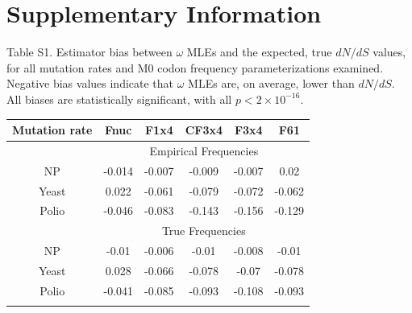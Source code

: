 \documentclass{pnastwo}
\begin{document}
	
\section{Supplementary Information}

\vspace{2cm}

\noindent Table S1. Estimator bias between $\omega$ MLEs and the expected, true $dN/dS$ values, for all mutation rates and M0 codon frequency parameterizations examined. Negative bias values indicate that $\omega$ MLEs are, on average, lower than $dN/dS$. All biases are statistically significant, with all $p < 2\times10^{-16}$.
\begin{table}[htbp]
	\begin{tabular}{c c c c c c}
		\hline\noalign{\smallskip}
		Mutation rate & Fnuc & F1x4 & CF3x4 & F3x4 & F61 \\
		\hline\noalign{\smallskip}
		& \multicolumn{5}{c}{Empirical Frequencies}\\
		\cline{2-6}\noalign{\medskip}
		NP & -0.014 & -0.007 & -0.009 & -0.007 & 0.02 \\ 
		Yeast & 0.022 & -0.061 & -0.079 & -0.072 & -0.062 \\ 
		Polio & -0.046 & -0.083 & -0.143 & -0.156 & -0.129 \\ 
		\hline\noalign{\medskip}
		& \multicolumn{5}{c}{True Frequencies}\\
		\cline{2-6}\noalign{\medskip}
		NP & -0.01 & -0.006 & -0.01 & -0.008 & -0.01 \\ 
		Yeast & 0.028 & -0.066 & -0.078 & -0.07 & -0.078 \\ 
		Polio & -0.041 & -0.085 & -0.093 & -0.108 & -0.093 \\ 
		\noalign{\smallskip}\hline\noalign{\smallskip}
	\end{tabular}
\end{table}	

\vspace{2cm}
\end{document}
